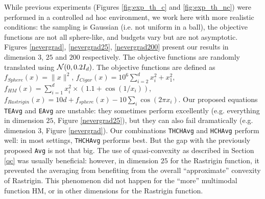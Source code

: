 While previous experiments (Figures \ref{fig:exp_th_c} and \ref{fig:exp_th_nc}) were performed in a controlled ad hoc environment, we work here with more realistic conditions: the sampling is Gaussian (i.e. not uniform in a ball), the objective functions are not all sphere-like, and budgets vary but are not asymptotic.
Figures \ref{nevergrad}, \ref{nevergrad25}, \ref{nevergrad200} present our results in dimension $3$, $25$ and $200$ respectively.
The objective functions are randomly translated using ${\cal N}(0,0.2I_d)$.
The objective functions are defined as
  $f_{Sphere}(x) = \lVert x\rVert ^2$, 
$f_{Cigar}(x) = 10^6 \sum_{i=2}^d x_i^2 + x_1^2$, 
$f_{HM}(x)=\sum_{i=1}^d x_i^2\times(1.1+\cos(1/x_i))$,
$f_{Rastrigin}(x) = 10d + f_{sphere}(x) - 10 \sum_i \cos(2\pi x_i)$.
Our proposed equations \texttt{TEAvg} and \texttt{EAvg} are unstable: they sometimes perform excellently (e.g. everything in dimension $25$, Figure \ref{nevergrad25}), but they can also fail dramatically  (e.g. dimension $3$, Figure \ref{nevergrad}).  
Our combinations \texttt{THCHAvg} and \texttt{HCHAvg} perform well: in most settings, \texttt{THCHAvg} performs best. But the gap with the previously proposed \texttt{Avg} is not that big. The use of quasi-convexity as described in Section \ref{qc} was usually beneficial: however, in dimension $25$ for the Rastrigin function, it prevented the averaging from benefiting from the overall ``approximate'' convexity of Rastrigin. This phenomenon did not happen for the ``more'' multimodal function HM, or in other dimensions for the Rastrigin function.
